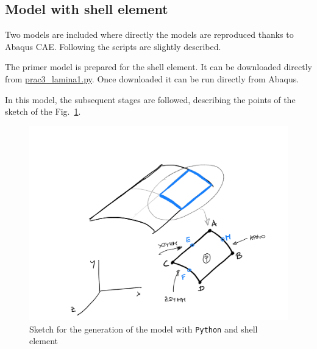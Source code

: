 \documentclass[english,a4paper,12pt]{article}
\begin{document}
\subsection{Model with shell element}

Two models are included where directly the models are reproduced thanks to Abaqus CAE.
Following the scripts are slightly described.

The primer model is prepared for the shell element.
It can be downloaded directly from \href{http://stokes.mecanica.upm.es/MCIC_open/practicas/scripts-python/prac3_lamina1.py}{\ttfamily prac3\_lamina1.py}. Once downloaded it can be run directly from Abaqus.

In this model, the subsequent stages are followed, describing the points of the sketch of the Fig.~\ref{fig:lamina1}.
\begin{figure}
\centering
	\includegraphics[scale=0.25]{figs/prac3_lamina1_fig.png}
	\caption{Sketch for the generation of the model with \texttt{Python} and shell element }
	\label{fig:lamina1}
\end{figure}
\end{document}
